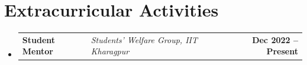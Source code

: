 \documentclass[letterpaper]{article}
\makeatletter
\newcommand{\resumeLeadership}[3]{
  \item
    \begin{tabular*}{1.0\textwidth}[t]{l @{\hspace{0.5em}}|@{\hspace{0.5em}}l @{\extracolsep{\fill}}r}
      \textbf{#1} & \textit{\small #2} & \textbf{\small #3} \\
    \end{tabular*}
}
\newcommand{\resumeSubheading}[5]{
  \item
    \begin{tabular*}{1.0\textwidth}[t]{l @{\hspace{0.5em}} | @{\hspace{0.5em}} l @{\hspace{0.5em}} | @{\hspace{0.5em}} l @{\extracolsep{\fill}} r}
      \textbf{#1} & \textit{\small #2} & \textit{\small #3} & \textbf{\small #4} \\
      \multicolumn{4}{l}{\textbf{\small Objective: }\small #5} \\
    \end{tabular*}
    \vspace{-10pt}
}
\newcommand{\resumeItem}[1]{
  \item 
    \small{{#1 \vspace{-2pt}}}
}
\newcommand{\resumeSubHeadingListStart}{
  \begin{itemize}[leftmargin=0.0in, label={}]
}
\newcommand{\resumeSubHeadingListEnd}{
  \end{itemize}
  \vspace{-10pt}
}
\newcommand{\resumeItemListStart}{
  \begin{itemize}[leftmargin=0.2in]
}
\newcommand{\resumeItemListEnd}{
  \end{itemize}
}
\makeatother
\begin{document}
\section{Extracurricular Activities}
\resumeSubHeadingListStart
  
  \resumeLeadership{Student Mentor}{Students' Welfare Group, IIT Kharagpur}{Dec 2022 -- Present}
    
\resumeSubHeadingListEnd
\end{document}
